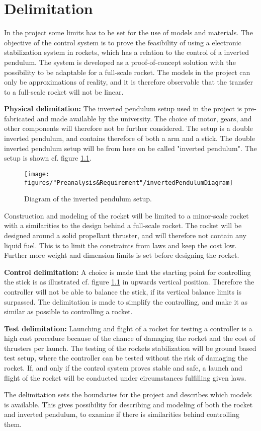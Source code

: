 \chapter{Delimitation}
In the project some limits has to be set for the use of models and materials. The objective of the control system is to prove the feasibility of using a electronic stabilization system in rockets, which has a relation to the control of a inverted pendulum. The system is developed as a proof-of-concept solution with the possibility to be adaptable for a full-scale rocket. The models in the project can only be approximations of reality, and it is therefore observable that the transfer to a full-scale rocket will not be linear.        

\textbf{Physical delimitation:}
The inverted pendulum setup used in the project is pre-fabricated and made available by the university.  The choice of motor, gears, and other components will therefore not be further considered. The setup is a double inverted pendulum, and contains therefore of both a arm and a stick. The double inverted pendulum setup will be from here on be called "inverted pendulum". The setup is shown cf. figure \ref{fig:InvertedPendulum1}.
\begin{figure}[htbp]
	\centering
	\texttt{[image: figures/"Preanalysis\&Requirement"/invertedPendulumDiagram]}
	\caption{Diagram of the inverted pendulum setup.} \label{fig:InvertedPendulum1}
\end{figure}


Construction and modeling of the rocket will be limited to a minor-scale rocket with a similarities to the design behind a full-scale rocket. The rocket will be designed around a solid propellant thruster, and will therefore not contain any liquid fuel. This is to limit the constraints from laws and keep the cost low. Further more weight and dimension limits is set before designing the rocket.
 
 
\textbf{Control delimitation:}
A choice is made that the starting point for controlling the stick is as illustrated cf. figure \ref{fig:InvertedPendulum1} in upwards vertical position. Therefore the controller will not be able to balance the stick, if its vertical balance limits is surpassed. The delimitation is made to simplify the controlling, and make it as similar as possible to controlling a rocket. 
 
 
\textbf{Test delimitation:}
Launching and flight of a rocket for testing a controller is a high cost procedure because of the chance of damaging the rocket and the cost of thrusters per launch. The testing of the rockets stabilization will be ground based test setup, where the controller can be tested without the risk of damaging the rocket. If, and only if the control system proves stable and safe, a launch and flight of the rocket will be conducted under circumstances fulfilling given laws.   
\bigbreak


The delimitation sets the boundaries for the project and describes which models is available. This gives possibility for describing and modeling of both the rocket and inverted pendulum, to examine if there is similarities behind controlling them. 